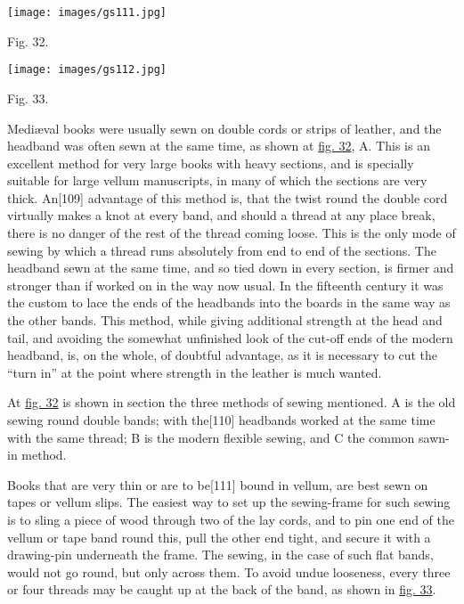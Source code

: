 \documentclass[
]{article}
\begin{document}
\protect\hypertarget{Fig_32}{}{}
\texttt{[image: images/gs111.jpg]}

Fig. 32.

\protect\hypertarget{Fig_33}{}{}
\texttt{[image: images/gs112.jpg]}

Fig. 33.

Mediæval books were usually sewn on double cords or strips of leather,
and the headband was often sewn at the same time, as shown at
\protect\hyperlink{Fig_32}{fig. 32}, A. This is an excellent method for
very large books with heavy sections, and is specially suitable for
large vellum manuscripts, in many of which the sections are very thick.
An{\protect\hypertarget{Page_109}{}{{[}109{]}}} advantage of this method
is, that the twist round the double cord virtually makes a knot at every
band, and should a thread at any place break, there is no danger of the
rest of the thread coming loose. This is the only mode of sewing by
which a thread runs absolutely from end to end of the sections. The
headband sewn at the same time, and so tied down in every section, is
firmer and stronger than if worked on in the way now usual. In the
fifteenth century it was the custom to lace the ends of the headbands
into the boards in the same way as the other bands. This method, while
giving additional strength at the head and tail, and avoiding the
somewhat unfinished look of the cut-off ends of the modern headband, is,
on the whole, of doubtful advantage, as it is necessary to cut the
``turn in'' at the point where strength in the leather is much wanted.

At \protect\hyperlink{Fig_32}{fig. 32} is shown in section the three
methods of sewing mentioned. A is the old sewing round double bands;
with the{\protect\hypertarget{Page_110}{}{{[}110{]}}} headbands worked
at the same time with the same thread; B is the modern flexible sewing,
and C the common sawn-in method.

Books that are very thin or are to
be{\protect\hypertarget{Page_111}{}{{[}111{]}}} bound in vellum, are
best sewn on tapes or vellum slips. The easiest way to set up the
sewing-frame for such sewing is to sling a piece of wood through two of
the lay cords, and to pin one end of the vellum or tape band round this,
pull the other end tight, and secure it with a drawing-pin underneath
the frame. The sewing, in the case of such flat bands, would not go
round, but only across them. To avoid undue looseness, every three or
four threads may be caught up at the back of the band, as shown in
\protect\hyperlink{Fig_33}{fig. 33}.
\end{document}
